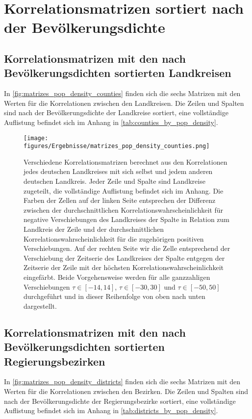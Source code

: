 \section{Korrelationsmatrizen sortiert nach der Bevölkerungsdichte}
\subsection{Korrelationsmatrizen mit den nach Bevölkerungsdichten sortierten Landkreisen}
In \autoref{fig:matrizes_pop_density_counties} finden sich die sechs Matrizen mit den Werten für die Korrelationen zwischen den Landkreisen. Die Zeilen und Spalten sind nach der Bevölkerungsdichte der Landkreise sortiert, eine vollständige Auflistung befindet sich im Anhang in \autoref{tab:counties_by_pop_density}.
\begin{figure}[H]
    \centering
    \texttt{[image: figures/Ergebnisse/matrizes\_pop\_density\_counties.png]}
    \caption{Verschiedene Korrelationsmatrizen berechnet aus den Korrelationen jedes deutschen Landkreises mit sich selbst und jedem anderen deutschen Landkreis. Jeder Zeile und Spalte sind Landkreise zugeteilt, die vollständige Auflistung befindet sich im Anhang. Die Farben der Zellen auf der linken Seite entsprechen der Differenz zwischen der durchschnittlichen Korrelationswahrscheinlichkeit für negative Verschiebungen des Landkreises der Spalte in Relation zum Landkreis der Zeile und der durchschnittlichen Korrelationswahrscheinlichkeit für die zugehörigen positiven Verschiebungen.
    Auf der rechten Seite wir die Zelle entsprechend der Verschiebung der Zeitserie des Landkreises der Spalte entgegen der Zeitserie der Zeile mit der höchsten Korrelationswahrscheinlichkeit eingefärbt. Beide Vorgehensweise werden für alle ganzzahligen Verschiebungen $\tau\in[-14,14]$,  $\tau\in[-30,30]$ und  $\tau\in[-50,50]$ durchgeführt und in dieser Reihenfolge von oben nach unten dargestellt.}
    \label{fig:matrizes_pop_density_counties}
\end{figure}


\subsection{Korrelationsmatrizen mit den nach Bevölkerungsdichten sortierten Regierungsbezirken}
In \autoref{fig:matrizes_pop_density_districts} finden sich die sechs Matrizen mit den Werten für die Korrelationen zwischen den Bezirken. Die Zeilen und Spalten sind nach der Bevölkerungsdichte der Regierungsbezirke sortiert, eine vollständige Auflistung befindet sich im Anhang in \autoref{tab:districts_by_pop_density}.

